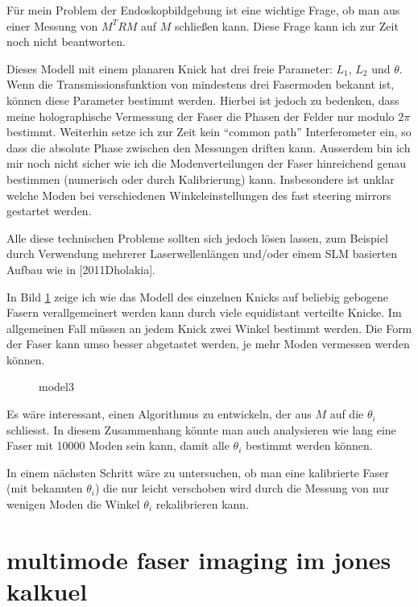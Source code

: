 \documentclass{article}
\begin{document}
F\"ur mein Problem der Endoskopbildgebung ist eine wichtige Frage, ob
man aus einer Messung von $M^TRM$ auf $M$ schlie\ss en kann. Diese
Frage kann ich zur Zeit noch nicht beantworten.

Dieses Modell mit einem planaren Knick hat drei freie Parameter:
$L_1$, $L_2$ und $\theta$. Wenn die Transmissionsfunktion von
mindestens drei Fasermoden bekannt ist, k\"onnen diese Parameter
bestimmt werden. Hierbei ist jedoch zu bedenken, dass meine
holographische Vermessung der Faser die Phasen der Felder nur modulo
$2\pi$ bestimmt. Weiterhin setze ich zur Zeit kein ``common path''
Interferometer ein, so dass die absolute Phase zwischen den Messungen
driften kann. Ausserdem bin ich mir noch nicht sicher wie ich die
Modenverteilungen der Faser hinreichend genau bestimmen (numerisch
oder durch Kalibrierung) kann. Insbesondere ist unklar welche Moden
bei verschiedenen Winkeleinstellungen des fast steering mirrors
gestartet werden.

Alle diese technischen Probleme sollten sich jedoch l\"osen lassen,
zum Beispiel durch Verwendung mehrerer Laserwellenl\"angen und/oder
einem SLM basierten Aufbau wie in [2011Dholakia].

In Bild \ref{fig:model3} zeige ich wie das Modell des einzelnen Knicks
auf beliebig gebogene Fasern verallgemeinert werden kann durch viele
equidistant verteilte Knicke. Im allgemeinen Fall m\"ussen an jedem
Knick zwei Winkel bestimmt werden. Die Form der Faser kann umso besser
abgetastet werden, je mehr Moden vermessen werden k\"onnen.


\begin{figure}[htbp]
  \centering
  
  \caption{model3}
  \label{fig:model3}
\end{figure}

Es w\"are interessant, einen Algorithmus zu entwickeln, der aus $M$
auf die $\theta_i$ schliesst. In diesem Zusammenhang k\"onnte man auch
analysieren wie lang eine Faser mit 10000 Moden sein kann, damit alle
$\theta_i$ bestimmt werden k\"onnen.

In einem n\"achsten Schritt w\"are zu untersuchen, ob man eine
kalibrierte Faser (mit bekannten $\theta_i$) die nur leicht verschoben
wird durch die Messung von nur wenigen Moden die Winkel $\theta_i$
rekalibrieren kann.

\section{multimode faser imaging im jones kalkuel}
\end{document}
